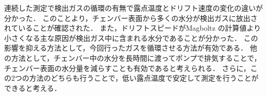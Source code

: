 \documentclass[../master]{subfiles}
\begin{document}
連続した測定で検出ガスの循環の有無で露点温度とドリフト速度の変化の違いが分かった．
このことより，チェンバー表面から多くの水分が検出ガスに放出されていることが確認された．
また，ドリフトスピードがMagboltz の計算値より小さくなる主な原因が検出ガス中に含まれる水分であることが分かった．
この影響を抑える方法として，今回行ったガスを循環させる方法が有効である．
他の方法として，チェンバー中の水分を長時間に渡ってポンプで排気することで，
チェンバー表面の水分量を減らすことも有効であると考えられる．
さらに，この2つの方法のどちらも行うことで，低い露点温度で安定して測定を行うことができると考える．
\end{document}
